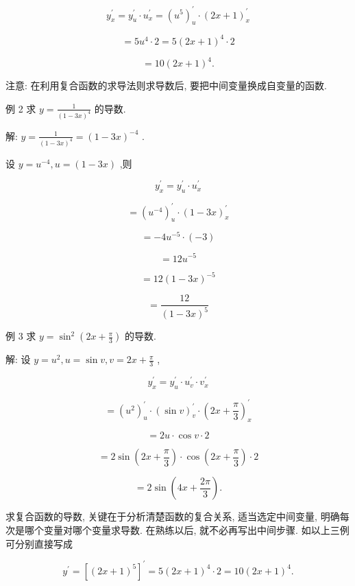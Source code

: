 \documentclass[lang=cn,newtx,10pt,scheme=chinese]{elegantbook}
\begin{document}
\[
{y}_{x}^{\prime } = {y}_{u}^{\prime } \cdot {u}_{x}^{\prime } = {\left( {u}^{5}\right) }_{u}^{\prime } \cdot {\left( 2x + 1\right) }_{x}^{\prime }
\]

\[
= 5{u}^{4} \cdot 2 = 5{\left( 2x + 1\right) }^{4} \cdot 2
\]

\[
= {10}{\left( 2x + 1\right) }^{4}\text{.}
\]

注意: 在利用复合函数的求导法则求导数后, 要把中间变量换成自变量的函数.

例 2 求 \(y = \frac{1}{{\left( 1 - 3x\right) }^{4}}\) 的导数.

解: \(y = \frac{1}{{\left( 1 - 3x\right) }^{4}} = {\left( 1 - 3x\right) }^{-4}\) .

设 \(y = {u}^{-4},u = \left( {1 - {3x}}\right)\) ,则

\[
{y}_{x}^{\prime } = {y}_{u}^{\prime } \cdot {u}_{x}^{\prime }
\]

\[
= {\left( {u}^{-4}\right) }_{u}^{\prime } \cdot {\left( 1 - 3x\right) }_{x}^{\prime }
\]

\[
= - 4{u}^{-5} \cdot \left( {-3}\right)
\]

\[
= {12}{u}^{-5}
\]

\[
= {12}{\left( 1 - 3x\right) }^{-5}
\]

\[
= \frac{12}{{\left( 1 - 3x\right) }^{5}}
\]

例 3 求 \(y = {\sin }^{2}\left( {{2x} + \frac{\pi }{3}}\right)\) 的导数.

解: 设 \(y = {u}^{2},u = \sin v,v = {2x} + \frac{\pi }{3}\) ,

\[
{y}_{x}^{\prime } = {y}_{u}^{\prime } \cdot {u}_{v}^{\prime } \cdot {v}_{x}^{\prime }
\]

\[
= {\left( {u}^{2}\right) }_{u}^{\prime } \cdot {\left( \sin v\right) }_{v}^{\prime } \cdot {\left( 2x + \frac{\pi }{3}\right) }_{x}^{\prime }
\]

\[
= {2u} \cdot \cos v \cdot 2
\]

\[
= 2\sin \left( {{2x} + \frac{\pi }{3}}\right) \cdot \cos \left( {{2x} + \frac{\pi }{3}}\right) \cdot 2
\]

\[
= 2\sin \left( {{4x} + \frac{2\pi }{3}}\right) \text{.}
\]

求复合函数的导数, 关键在于分析清楚函数的复合关系, 适当选定中间变量, 明确每次是哪个变量对哪个变量求导数. 在熟练以后, 就不必再写出中间步骤. 如以上三例可分别直接写成

\[
{y}^{\prime } = {\left\lbrack {\left( 2x + 1\right) }^{5}\right\rbrack }^{\prime } = 5{\left( 2x + 1\right) }^{4} \cdot 2 = {10}{\left( 2x + 1\right) }^{4}.
\]
\end{document}
